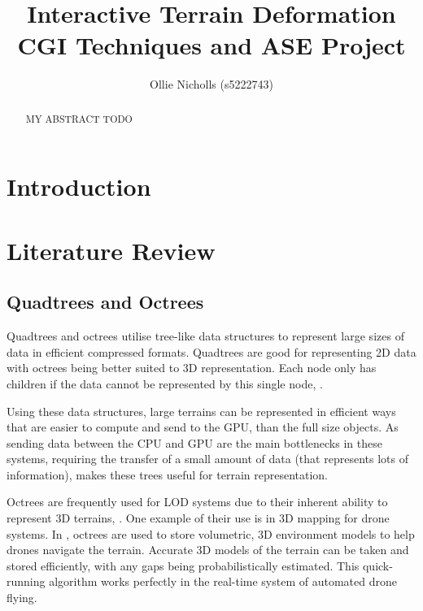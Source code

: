\documentclass[notitlepage,12pt]{article}
\title{%
Interactive Terrain Deformation \\
\large CGI Techniques and ASE Project}
\author{Ollie Nicholls (s5222743)}
\date{}
\begin{document}
\maketitle

\thispagestyle{empty}

\begin{abstract}
\noindent MY ABSTRACT TODO
\end{abstract}

\newpage
\clearpage
\setcounter{page}{1}

\section{Introduction}



\section{Literature Review}

\subsection{Quadtrees and Octrees}

Quadtrees and octrees utilise tree-like data structures to represent large sizes of data in efficient compressed formats. Quadtrees are good for representing 2D data with octrees being better suited to 3D representation. Each node only has children if the data cannot be represented by this single node, \cite{quadtreesOctrees}. 

Using these data structures, large terrains can be represented in efficient ways that are easier to compute and send to the GPU, than the full size objects. As sending data between the CPU and GPU are the main bottlenecks in these systems, requiring the transfer of a small amount of data (that represents lots of information), makes these trees useful for terrain representation.

Octrees are frequently used for LOD systems due to their inherent ability to represent 3D terrains, \cite{lod}. One example of their use is in 3D mapping for drone systems. In \cite{octrees}, octrees are used to store volumetric, 3D environment models to help drones navigate the terrain. Accurate 3D models of the terrain can be taken and stored efficiently, with any gaps being probabilistically estimated. This quick-running algorithm works perfectly in the real-time system of automated drone flying.
\end{document}
